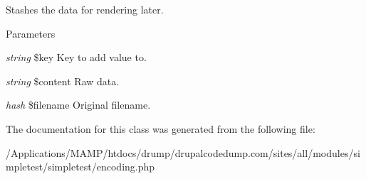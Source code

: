 \label{class_simple_attachment_a52aee178378d8a5ac82c62090c1e30a8}
Stashes the data for rendering later. 
\begin{DoxyParams}{Parameters}
\item[{\em string}]\$key Key to add value to. \item[{\em string}]\$content Raw data. \item[{\em hash}]\$filename Original filename. \end{DoxyParams}


The documentation for this class was generated from the following file:\begin{DoxyCompactItemize}
\item 
/Applications/MAMP/htdocs/drump/drupalcodedump.com/sites/all/modules/simpletest/simpletest/encoding.php\end{DoxyCompactItemize}
